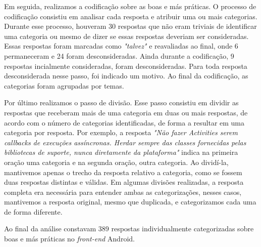 Em seguida, realizamos a codificação sobre as boas e más práticas. O processo de codificação consistiu em analisar cada resposta e atribuir uma ou mais categorias. Durante esse processo, houveram 30 respostas que não eram triviais de identificar uma categoria ou mesmo de dizer se essas respostas deveriam ser consideradas. Essas respostas foram marcadas como \textit{"talvez"} e reavaliadas ao final, onde 6 permaneceram e 24 foram desconsideradas. Ainda durante a codificação, 9 respostas incialmente consideradas, foram desconsideradas. Para toda resposta desconsiderada nesse passo, foi indicado um motivo. Ao final da codificação, as categorias foram agrupadas por temas.

Por último realizamos o passo de divisão. Esse passo consistiu em dividir as respostas que receberam mais de uma categoria em duas ou mais respostas, de acordo com o número de categorias identificadas, de forma a resultar em uma categoria por resposta. Por exemplo, a resposta \textit{"Não fazer Activities serem callbacks de execuções assíncronas. Herdar sempre das classes fornecidas pelas bibliotecas de suporte, nunca diretamente da plataforma"} indica na primeira oração uma categoria e na segunda oração, outra categoria. Ao dividí-la, mantivemos apenas o trecho da resposta relativo a categoria, como se fossem duas respostas distintas e válidas. Em algumas divisões realizadas, a resposta completa era necessária para entender ambas as categorizações, nesses casos, mantivemos a resposta original, mesmo que duplicada, e categorizamos cada uma de forma diferente. 

Ao final da análise constavam 389 respostas individualmente categorizadas sobre boas e más práticas no \textit{front-end} Android.